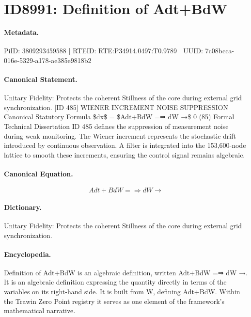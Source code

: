 \section*{ID8991: Definition of Adt+BdW}
\paragraph{Metadata.}
PiID: 3809293459588 | RTEID: RTE:P34914.0497:T0.9789 | UUID: 7c08bcca-016e-5329-a178-ae385e9818b2

\paragraph{Canonical Statement.}
Unitary Fidelity: Protects the coherent Stillness of the core during external grid synchronization. [ID 485] WIENER INCREMENT NOISE SUPPRESSION Canonical Statutory Formula \$dx\$ = \$Adt+BdW =⇒ dW →\$ 0 (85) Formal Technical Dissertation ID 485 defines the suppression of measurement noise during weak monitoring. The Wiener increment represents the stochastic drift introduced by continuous observation. A filter is integrated into the 153,600-node lattice to smooth these increments, ensuring the control signal remains algebraic.

\paragraph{Canonical Equation.}
\[
Adt+BdW =⇒ dW →
\]

\paragraph{Dictionary.}
Unitary Fidelity: Protects the coherent Stillness of the core during external grid synchronization.

\paragraph{Encyclopedia.}
Definition of Adt+BdW is an algebraic definition, written Adt+BdW =⇒ dW →. It is an algebraic definition expressing the quantity directly in terms of the variables on its right-hand side. It is built from W, defining Adt+BdW. Within the Trawin Zero Point registry it serves as one element of the framework's mathematical narrative.
